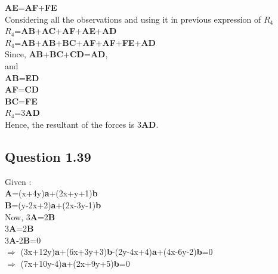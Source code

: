 \documentclass{article}
\begin{document}
	\textbf{AE}=\textbf{AF}+\textbf{FE}\\
	
    Considering all the observations and using it in previous expression of \textbf{$R_{4}$}  \\
    
	\textbf{$R_{4}$}=\textbf{AB}+\textbf{AC}+\textbf{AF}+\textbf{AE}+\textbf{AD} \\
	
	\textbf{$R_{4}$}=\textbf{AB}+\textbf{AB}+\textbf{BC}+\textbf{AF}+\textbf{AF}+\textbf{FE}+\textbf{AD}\\
	
	Since, \textbf{AB}+\textbf{BC}+\textbf{CD}=\textbf{AD},\\
	and \\
	
	\textbf{AB}=\textbf{ED}\\
	
	\textbf{AF}=\textbf{CD}\\
	
	\textbf{BC}=\textbf{FE}\\
	
	\textbf{$R_{4}$}=3\textbf{AD} \\
	
	Hence, the resultant of the forces is 3\textbf{AD}. 
	
	
	
	\subsection{Question 1.39}	
	
	Given :\\
	
	\textbf{A}=(x+4y)\textbf{a}+(2x+y+1)\textbf{b}\\

	\textbf{B}=(y-2x+2)\textbf{a}+(2x-3y-1)\textbf{b}\\
	
	Now, 3\textbf{A}=2\textbf{B} \\
	
	3\textbf{A}=2\textbf{B}\\
	
	3\textbf{A}-2\textbf{B}=0\\
	
$\Rightarrow$ (3x+12y)\textbf{a}+(6x+3y+3)\textbf{b}-(2y-4x+4)\textbf{a}+(4x-6y-2)\textbf{b}=0\\

$\Rightarrow$ (7x+10y-4)\textbf{a}+(2x+9y+5)\textbf{b}=0\\
\end{document}
